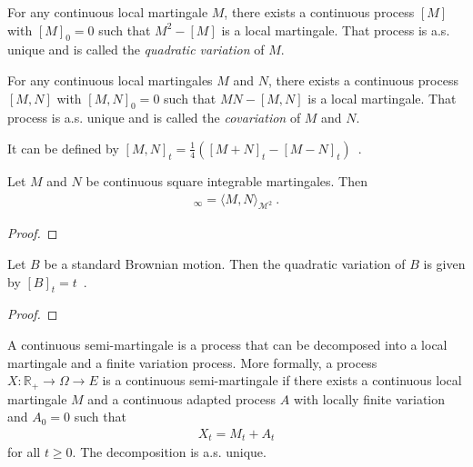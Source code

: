 \begin{definition}\label{def:quadraticVariation}
For any continuous local martingale $M$, there exists a continuous process $[M]$ with $[M]_0 = 0$ such that $M^2 - [M]$ is a local martingale. That process is a.s. unique and is called the \emph{quadratic variation} of $M$.
\end{definition}


\begin{definition}[Covariation]\label{def:covariation}
For any continuous local martingales $M$ and $N$, there exists a continuous process $[M,N]$ with $[M,N]_0 = 0$ such that $MN - [M,N]$ is a local martingale. That process is a.s. unique and is called the \emph{covariation} of $M$ and $N$.

It can be defined by $[M, N]_t = \frac{1}{4}\left([M+N]_t - [M-N]_t \right)$~.
\end{definition}


\begin{lemma}\label{lem:covariation_eq_inner}
Let $M$ and $N$ be continuous square integrable martingales. Then
\begin{align*}
  [M,N]_\infty = \langle M, N \rangle_{\mathcal{M}^2}
  \: .
\end{align*}
\end{lemma}

\begin{proof}

\end{proof}


\begin{lemma}\label{lem:quadraticVariation_brownian}
Let $B$ be a standard Brownian motion. Then the quadratic variation of $B$ is given by $[B]_t = t$~.
\end{lemma}

\begin{proof}

\end{proof}


\begin{definition}\label{def:continuousSemiMartingale}
A continuous semi-martingale is a process that can be decomposed into a local martingale and a finite variation process.
More formally, a process $X : \mathbb{R}_+ \to \Omega \to E$ is a continuous semi-martingale if there exists a continuous local martingale $M$ and a continuous adapted process $A$ with locally finite variation and $A_0 = 0$ such that
\begin{align*}
  X_t = M_t + A_t
\end{align*}
for all $t \ge 0$.
The decomposition is a.s. unique.
\end{definition}


